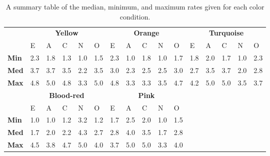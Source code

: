 \begin{table}[hbt!]
    \renewcommand{\arraystretch}{1}
    \begin{center}
        \begin{tabular}{p{}|
        p{}|p{}|p{}|p{}|p{}||
        p{}|p{}|p{}|p{}|p{}||
        p{}|p{}|p{}|p{}|p{}|}
            \cline{2-16}
            & \multicolumn{5}{c||}{\textbf{Yellow}} & \multicolumn{5}{c||}{\textbf{Orange}}
            & \multicolumn{5}{c|}{\textbf{Turquoise}} \\
            \cline{2-16}
            & E & A & C & N & O & E & A & C & N & O & E & A & C & N & O      \\
            \cline{2-16}
            \textbf{Min}    & 2.3 & 1.8 & 1.3 & 1.0 & 1.5 & 2.3 & 1.0 & 1.8 & 1.0 & 1.7 & 1.8 & 2.0 & 1.7 & 1.0 & 2.3  \\
            \textbf{Med}    & 3.7 & 3.7 & 3.5 & 2.2 & 3.5 & 3.0 & 2.3 & 2.5 & 2.5 & 3.0 & 2.7 & 3.5 & 3.7 & 2.0 & 2.8  \\
            \textbf{Max}    & 4.8 & 5.0 & 4.8 & 3.3 & 5.0 & 4.8 & 3.3 & 3.3 & 3.5 & 4.7 & 4.2 & 5.0 & 5.0 & 3.5 & 3.7 \\
            \cline{2-16}
            \cline{2-11}
            &  \multicolumn{5}{|c||}{\textbf{Blood-red}} & \multicolumn{5}{|c||}{\textbf{Pink}} \\
            \cline{2-11}
            & E & A & C & N & O & E & A & C & N & O            \\
            \cline{2-11}
            \textbf{Min}    & 1.0 & 1.0 & 1.2 & 3.2 & 1.2 & 1.7 & 2.5 & 2.0 & 1.0 & 1.5    \\
            \textbf{Med}    & 1.7 & 2.0 & 2.2 & 4.3 & 2.7 & 2.8 & 4.0 & 3.5 & 1.7 & 2.8    \\
            \textbf{Max}    & 4.5 & 3.8 & 4.7 & 5.0 & 4.0 & 3.7 & 5.0 & 5.0 & 3.3 & 4.0    \\
            \cline{2-11}
        \end{tabular}
        \caption{A summary table of the median, minimum, and maximum rates given for each color condition.}
        \label{table:medianML2}
    \end{center}
\end{table}
